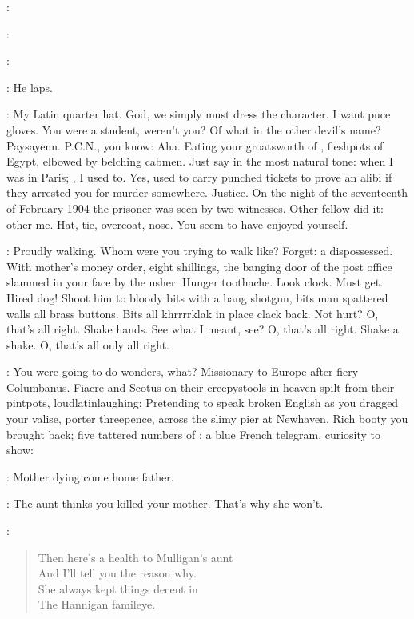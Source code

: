 \patrice:

\Stephen:

\patrice:

\StephenInt:
He laps.

\StephenInt:
My Latin quarter hat.
God, we simply must dress the character.
I want puce gloves.
You were a student, weren't you?
Of what in the other devil's name?
Paysayenn.
P.C.N., you know:
Aha.
Eating your groatsworth of ,
fleshpots of Egypt, elbowed by belching cabmen.
Just say in the most natural tone:
when I was in Paris;
, I used to.
Yes, used to carry punched tickets to prove an alibi
if they arrested you for murder somewhere.
Justice.
On the night of the seventeenth of February 1904
the prisoner was seen by two witnesses.
Other fellow did it:
other me.
Hat, tie, overcoat, nose.
You seem to have enjoyed yourself.

\StephenInt:
Proudly walking.
Whom were you trying to walk like?
Forget:
a dispossessed.
With mother's money order, eight shillings,
the banging door of the post office slammed in your face by the usher.
Hunger toothache.
Look clock.
Must get.
Hired dog!
Shoot him to bloody bits with a bang shotgun,
bits man spattered walls all brass buttons.
Bits all khrrrrklak in place clack back.
Not hurt?
O, that's all right.
Shake hands.
See what I meant, see?
O, that's all right.
Shake a shake.
O, that's all only all right.

\StephenInt:
You were going to do wonders, what?
Missionary to Europe after fiery Columbanus.
Fiacre and Scotus on their creepystools in heaven
spilt from their pintpots, loudlatinlaughing:
Pretending to speak broken English
as you dragged your valise, porter threepence,
across the slimy pier at Newhaven.
Rich booty you brought back;
five tattered numbers of ;
a blue French telegram, curiosity to show:

\simon:
Mother dying come home father.

\buck:
The aunt thinks you killed your mother.
That's why she won't.

:
\begin{verse}
    Then here's a health to Mulligan's aunt \\
    And I'll tell you the reason why. \\
    She always kept things decent in \\
    The Hannigan famileye.
\end{verse}


